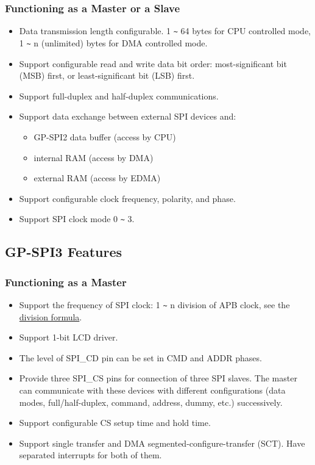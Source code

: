 \documentclass[main\_\_EN.tex]{subfiles}
\begin{document}
\subsubsection{Functioning as a Master or a Slave}
  \begin{itemize}
    \item Data transmission length configurable. 1 \verb+~+ 64 bytes for CPU controlled mode, 1 \verb+~+ n (unlimited) bytes for DMA controlled mode.
    \item Support configurable read and write data bit order: most-significant bit (MSB) first, or least-significant bit (LSB) first.

    \item Support full-duplex and half-duplex communications.
    \item Support data exchange between external SPI devices and:
      \begin{itemize}
        \item GP-SPI2 data buffer (access by CPU)
        \item internal RAM (access by DMA)
        \item external RAM (access by EDMA)
      \end{itemize}

    \item Support configurable clock frequency, polarity, and phase.
    \item Support SPI clock mode 0 \verb+~+ 3.
  \end{itemize}

\subsection{GP-SPI3 Features}

\subsubsection{Functioning as a Master}
  \begin{itemize}
    \item Support the frequency of SPI clock: 1 \verb+~+ n division of APB clock, see the \hyperref[division-formula]{division formula}.
    \item Support 1-bit LCD driver.
    \item The level of SPI\_CD pin can be set in CMD and ADDR phases.
    \item Provide three SPI\_CS pins for connection of three SPI slaves. The master can communicate with these devices with different configurations (data modes, full/half-duplex, command, address, dummy, etc.) successively.
    \item Support configurable CS setup time and hold time.
    \item Support single transfer and DMA segmented-configure-transfer (SCT). Have separated interrupts for both of them.
  \end{itemize}
\end{document}
